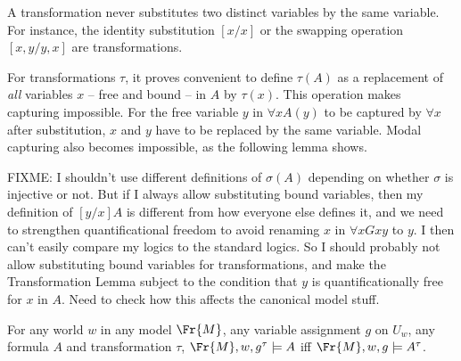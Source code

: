 \documentclass[11pt]{woarticle}
\theoremstyle{break}
\theoremstyle{nonumberplain}
\newcommand{\1}{\;\,|\;\,}
\begin{document}
A transformation never substitutes two distinct variables by the same variable.
For instance, the identity substitution $[x/x]$ or the swapping operation
$[x,y/y,x]$ are transformations.

For transformations $\tau$, it proves convenient to define $\tau(A)$ as a
replacement of \emph{all} variables $x$ -- free and bound -- in $A$ by
$\tau(x)$. This operation makes capturing impossible. For the free variable $y$
in $\forall x A(y)$ to be captured by $\forall x$ after substitution, $x$ and
$y$ have to be replaced by the same variable. Modal capturing also becomes
impossible, as the following lemma shows.

FIXME: I shouldn't use different definitions of $\sigma(A)$ depending on whether
$\sigma$ is injective or not. But if I always allow substituting bound
variables, then my definition of $[y/x]A$ is different from how everyone else
defines it, and we need to strengthen quantificational freedom to avoid renaming
$x$ in $\forall x Gxy$ to $y$. I then can't easily compare my logics to the
standard logics. So I should probably not allow substituting bound variables for
transformations, and make the Transformation Lemma subject to the condition that
$y$ is quantificationally free for $x$ in $A$. Need to check how this affects
the canonical model stuff.

\begin{lemma}\label{transl}
  For any world $w$ in any model $\Fr{M}$, any variable assignment $g$ on
  $U_{w}$, any formula $A$ and transformation $\tau$,
  $\Fr{M},w,g^\tau \models A$ iff $\Fr{M},w,g \models A^\tau$.
\end{lemma}
\end{document}
